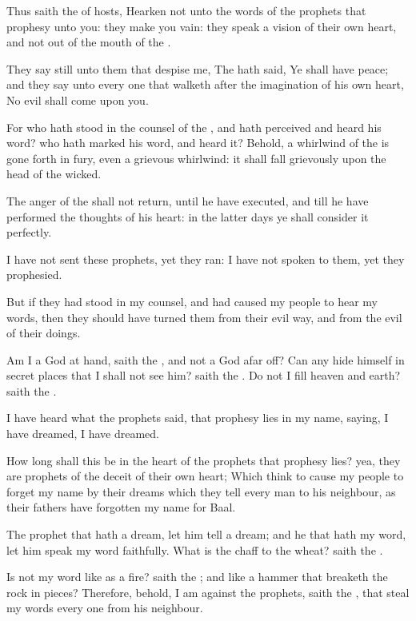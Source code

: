 \verse Thus saith the \LORD of hosts, Hearken not unto the words of the prophets that prophesy unto you: they make you vain: they speak a vision of their own heart, and not out of the mouth of the \LORD.

\verse They say still unto them that despise me, The \LORD hath said, Ye shall have peace; and they say unto every one that walketh after the imagination of his own heart, No evil shall come upon you.

\verse For who hath stood in the counsel of the \LORD, and hath perceived and heard his word? who hath marked his word, and heard it?  \verse Behold, a whirlwind of the \LORD is gone forth in fury, even a grievous whirlwind: it shall fall grievously upon the head of the wicked.

\verse The anger of the \LORD shall not return, until he have executed, and till he have performed the thoughts of his heart: in the latter days ye shall consider it perfectly.

\verse I have not sent these prophets, yet they ran: I have not spoken to them, yet they prophesied.

\verse But if they had stood in my counsel, and had caused my people to hear my words, then they should have turned them from their evil way, and from the evil of their doings.

\verse Am I a God at hand, saith the \LORD, and not a God afar off?  \verse Can any hide himself in secret places that I shall not see him?  saith the \LORD. Do not I fill heaven and earth? saith the \LORD.

\verse I have heard what the prophets said, that prophesy lies in my name, saying, I have dreamed, I have dreamed.

\verse How long shall this be in the heart of the prophets that prophesy lies? yea, they are prophets of the deceit of their own heart; \verse Which think to cause my people to forget my name by their dreams which they tell every man to his neighbour, as their fathers have forgotten my name for Baal.

\verse The prophet that hath a dream, let him tell a dream; and he that hath my word, let him speak my word faithfully. What is the chaff to the wheat? saith the \LORD.

\verse Is not my word like as a fire? saith the \LORD; and like a hammer that breaketh the rock in pieces?  \verse Therefore, behold, I am against the prophets, saith the \LORD, that steal my words every one from his neighbour.

